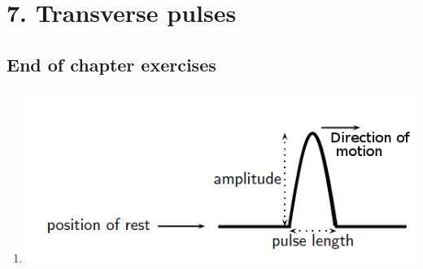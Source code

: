 \section {7. Transverse pulses}
% 

\subsection{End of chapter exercises} 

\begin{enumerate}[noitemsep, label=\textbf{\arabic*}. ] 
\item %
\includegraphics[width=.4\textwidth]{photos/transverse_pulses_eocex.png}
\end{enumerate}

